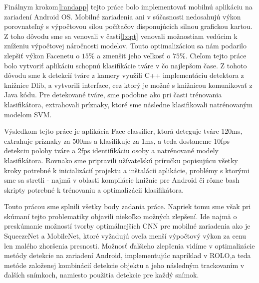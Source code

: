 \noindent Finálnym krokom\ref{l:andapp} tejto práce bolo implementovať mobilnú aplikáciu na zariadení Android OS.
Mobilné zariadenia ani v súčasnosti nedosahujú výkon porovnateľný s výpočtovou silou počítačov disponujúcich silnou grafickou kartou.
Z toho dôvodu sme sa venovali v časti\ref{l:opt} venovali možnostiam vedúcim k zníženiu výpočtovej náročnosti modelov.
Touto optimalizáciou sa nám podarilo zlepšiť výkon Facenetu o $ 15\% $ a zmenšiť jeho veľkosť o $ 75\% $.
Cieľom tejto práce bolo vytvoriť aplikáciu schopnú klasifikácie tváre v čo najlepšom čase.
Z tohoto dôvodu sme k detekcií tváre z kamery využili C++ implementáciu detektora z knižnice Dlib, a vytvorili interface, cez ktorý je možné s knižnicou komunikovať z Java kódu.
Pre detekované tváre, sme podobne ako pri časti trénovania klasifikátora, extrahovali príznaky, ktoré sme následne klasifikovali natrénovaným modelom SVM.


\noindent Výsledkom tejto práce je aplikácia Face classifier, ktorá deteguje tváre 120ms, extrahuje príznaky za 500ms a klasifikuje za 1ms, a teda dostaneme 10fps detekciu polohy tváre a 2fps identifikáciu osoby a natrénované modely klasifikátora.
Rovnako sme pripravili užívateľskú príručku popisujúcu všetky kroky potrebné k inicializácií projektu a inštalácii aplikácie, problémy s ktorými sme sa stretli - najmä v oblasti kompilácie knižníc pre Android či rôzne bash skripty potrebné k trénovaniu a optimalizácii klasifikátora.

\noindent Touto prácou sme splnili všetky body zadania práce.
Napriek tomu sme však pri skúmaní tejto problematiky objavili niekoľko možných zlepšení.
Ide najmä o preskúmanie možností tvorby optimálnejších CNN pre mobilné zariadenia ako je SqueezeNet\cite{IandolaMAHDK16} a MobileNet\cite{HowardZCKWWAA17}, ktoré vyžadujú oveľa menší výpočtový výkon za cenu len malého zhoršenia presnosti.
Možnosť ďalšieho zlepšenia vidíme v optimalizácie metódy detekcie na zariadení Android, implementujúc napríklad v ROLO\cite{redmon2016you},a teda metóde založenej kombinácií detekcie objektu a jeho následným trackovaním v ďalších snímkoch, namiesto použitia detekcie pre každý snímok.

